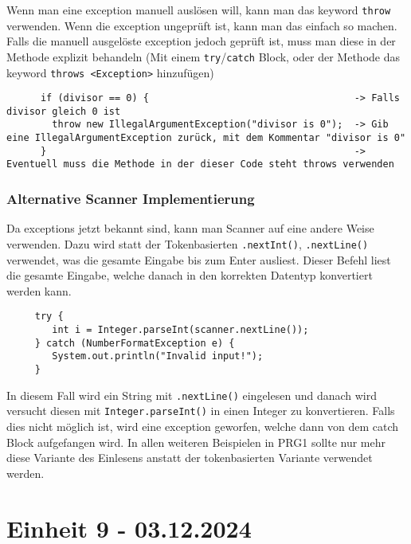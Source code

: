 \documentclass{article}
\begin{document}
	 Wenn man eine exception manuell auslösen will, kann man das keyword \verb|throw| verwenden. Wenn die exception ungeprüft ist, kann man das einfach so machen. Falls die manuell ausgelöste exception jedoch geprüft ist, muss man diese in der Methode explizit behandeln (Mit einem \verb|try|/\verb|catch| Block, oder der Methode das keyword \verb|throws <Exception>| hinzufügen)
	 \begin{verbatim}
	  if (divisor == 0) {                                    -> Falls divisor gleich 0 ist
	  	throw new IllegalArgumentException("divisor is 0");  -> Gib eine IllegalArgumentException zurück, mit dem Kommentar "divisor is 0"
	  }                                                      -> Eventuell muss die Methode in der dieser Code steht throws verwenden
	 \end{verbatim}
	 \subsubsection{Alternative Scanner Implementierung}
	 Da exceptions jetzt bekannt sind, kann man Scanner auf eine andere Weise verwenden. Dazu wird statt der Tokenbasierten \verb|.nextInt()|, \verb|.nextLine()| verwendet, was die gesamte Eingabe bis zum Enter ausliest. Dieser Befehl liest die gesamte Eingabe, welche danach in den korrekten Datentyp konvertiert werden kann.
	 \begin{verbatim}
	 try {
	 	int i = Integer.parseInt(scanner.nextLine());
	 } catch (NumberFormatException e) {
	 	System.out.println("Invalid input!");
	 }
	 \end{verbatim}
	 In diesem Fall wird ein String mit \verb|.nextLine()| eingelesen und danach wird versucht diesen mit \verb|Integer.parseInt()| in einen Integer zu konvertieren. Falls dies nicht möglich ist, wird eine exception geworfen, welche dann von dem catch Block aufgefangen wird. In allen weiteren Beispielen in PRG1 sollte nur mehr diese Variante des Einlesens anstatt der tokenbasierten Variante verwendet werden.
	 \section{Einheit 9 - 03.12.2024}
\end{document}
